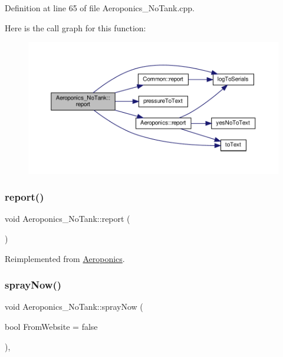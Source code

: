 Definition at line 65 of file Aeroponics\+\_\+\+No\+Tank.\+cpp.

Here is the call graph for this function\+:
\nopagebreak
\begin{figure}[H]
\begin{center}
\leavevmode
\includegraphics[width=350pt]{class_aeroponics___no_tank_af2f6dfdcfd4365ed35aa83176113ff86_cgraph}
\end{center}
\end{figure}
\mbox{\label{class_aeroponics___no_tank_af2f6dfdcfd4365ed35aa83176113ff86}} 
\subsubsection{\texorpdfstring{report()}{report()}\hspace{0.1cm}{\footnotesize\ttfamily [2/2]}}
{\footnotesize\ttfamily void Aeroponics\+\_\+\+No\+Tank\+::report (\begin{DoxyParamCaption}{ }\end{DoxyParamCaption})\hspace{0.3cm}{\ttfamily [virtual]}}



Reimplemented from \hyperlink{class_aeroponics_a3dbfce027ab5fa736a6007a6ae75ee4e}{Aeroponics}.

\mbox{\label{class_aeroponics___no_tank_a91a9ce3552f1f726d26aa79fad04116e}} 
\subsubsection{\texorpdfstring{spray\+Now()}{sprayNow()}\hspace{0.1cm}{\footnotesize\ttfamily [1/2]}}
{\footnotesize\ttfamily void Aeroponics\+\_\+\+No\+Tank\+::spray\+Now (\begin{DoxyParamCaption}\item[{bool}]{From\+Website = {\ttfamily false} }\end{DoxyParamCaption})\hspace{0.3cm}{\ttfamily [protected]}, {\ttfamily [virtual]}}



